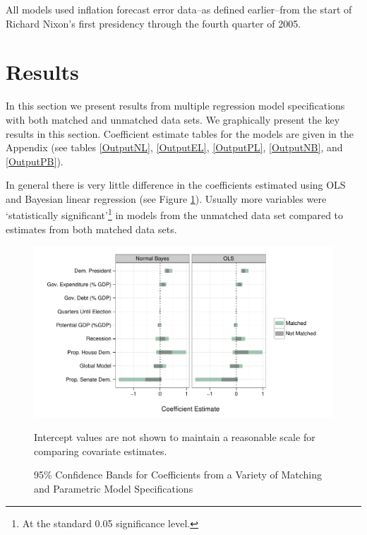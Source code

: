 \documentclass[a4paper]{article}\usepackage{graphicx, color}
\newenvironment{knitrout}{}{} %
\begin{document}
All models used inflation forecast error data--as defined earlier--from the start of Richard Nixon's first presidency through the fourth quarter of 2005. 

\section{Results}

In this section we present results from multiple regression model specifications with both matched and unmatched data sets. We graphically present the key results in this section. Coefficient estimate tables for the models are given in the Appendix (see tables \ref{OutputNL}, \ref{OutputEL}, \ref{OutputPL}, \ref{OutputNB}, and \ref{OutputPB}).

In general there is very little difference in the coefficients estimated using OLS and Bayesian linear regression (see Figure \ref{CoefComparePlots}). Usually more variables were `statistically significant'\footnote{At the standard 0.05 significance level.} in models from the unmatched data set compared to estimates from both matched data sets.




\begin{figure}[t]
    \caption{95\% Confidence Bands for Coefficients from a Variety of Matching and Parametric Model Specifications}
    \label{CoefComparePlots}
    \begin{center}

\begin{knitrout}
\color{fgcolor}\includegraphics[width=0.95\linewidth]{figure/CoefComparePlots} 
\end{knitrout}

    \end{center}
    \begin{singlespace}
        {\scriptsize{Intercept values are not shown to maintain a reasonable scale for comparing covariate estimates.}}
    \end{singlespace}
\end{figure}
\end{document}
